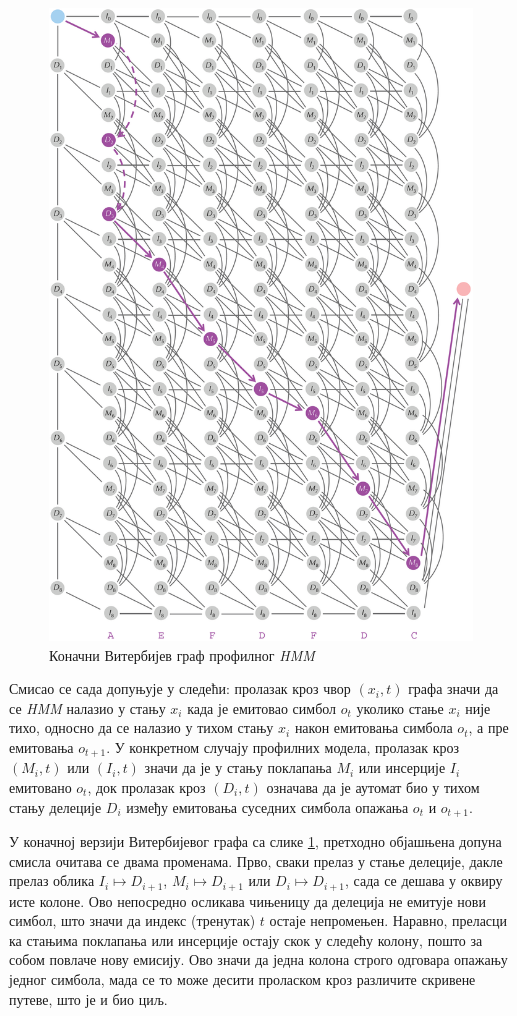 \documentclass[12pt,oneside]{memoir}
\begin{document}
\begin{CJK}{UTF8}{ipxm}
\begin{figure}[H]
  \centering
  \includegraphics[width=.85\textwidth]{prof_vit2.png}
  \caption{Коначни Витербијев граф профилног \textit{HMM} \cite{compeau2015}}
  \label{fig:prof_vit2}
\end{figure}

Смисао се сада допуњује у следећи: пролазак кроз чвор $(x_i, t)$ графа значи да се \textit{HMM} налазио у стању $x_i$ када је емитовао симбол $o_t$ уколико стање $x_i$ није тихо, односно да се налазио у тихом стању $x_i$ након емитовања симбола $o_t$, а пре емитовања $o_{t+1}$. У конкретном случају профилних модела, пролазак кроз $(M_i, t)$ или $(I_i, t)$ значи да је у стању поклапања $M_i$ или инсерције $I_i$ емитовано $o_t$, док пролазак кроз $(D_i, t)$ означава да је аутомат био у тихом стању делеције $D_i$ између емитовања суседних симбола опажања $o_t$ и $o_{t+1}$.

У коначној верзији Витербијевог графа са слике \ref{fig:prof_vit2}, претходно објашњена допуна смисла очитава се двама променама. Прво, сваки прелаз у стање делеције, дакле прелаз облика $I_i \mapsto D_{i+1}$, $M_i \mapsto D_{i+1}$ или $D_i \mapsto D_{i+1}$, сада се дешава у оквиру исте колоне. Ово непосредно осликава чињеницу да делеција не емитује нови симбол, што значи да индекс (тренутак) $t$ остаје непромењен. Наравно, преласци ка стањима поклапања или инсерције остају скок у следећу колону, пошто за собом повлаче нову емисију. Ово значи да једна колона строго одговара опажању једног симбола, мада се то може десити проласком кроз различите скривене путеве, што је и био циљ.


\end{CJK}
\end{document}
